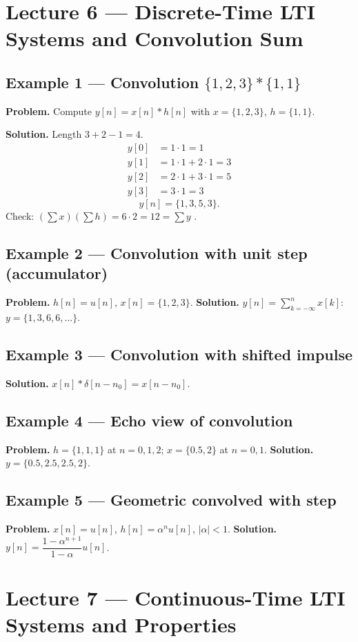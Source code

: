 \documentclass[11pt]{article}
\begin{document}
\section{Lecture 6 --- Discrete-Time LTI Systems and Convolution Sum}

\subsection{Example 1 --- Convolution $\{1,2,3\}\ast\{1,1\}$}
\textbf{Problem.} Compute $y[n]=x[n]*h[n]$ with $x=\{1,2,3\}$, $h=\{1,1\}$.

\textbf{Solution.} Length $3+2-1=4$.
\begin{align*}
y[0]&=1\cdot 1=1\\
y[1]&=1\cdot 1+2\cdot 1=3\\
y[2]&=2\cdot 1+3\cdot 1=5\\
y[3]&=3\cdot 1=3
\end{align*}
\[y[n]=\{1,3,5,3\}.\]
Check: $(\sum x)(\sum h)=6\cdot 2=12=\sum y$ \checkmark.

\subsection{Example 2 --- Convolution with unit step (accumulator)}
\textbf{Problem.} $h[n]=u[n]$, $x[n]=\{1,2,3\}$.
\textbf{Solution.} $y[n]=\sum_{k=-\infty}^{n}x[k]$: $y=\{1,3,6,6,\ldots\}$.

\subsection{Example 3 --- Convolution with shifted impulse}
\textbf{Solution.} $x[n]*\delta[n-n_0]=x[n-n_0]$.

\subsection{Example 4 --- Echo view of convolution}
\textbf{Problem.} $h=\{1,1,1\}$ at $n=0,1,2$; $x=\{0.5,2\}$ at $n=0,1$.
\textbf{Solution.} $y=\{0.5,2.5,2.5,2\}$.

\subsection{Example 5 --- Geometric convolved with step}
\textbf{Problem.} $x[n]=u[n]$, $h[n]=\alpha^n u[n]$, $|\alpha|<1$.
\textbf{Solution.} $y[n]=\dfrac{1-\alpha^{n+1}}{1-\alpha}u[n]$.

\section{Lecture 7 --- Continuous-Time LTI Systems and Properties}
\end{document}

